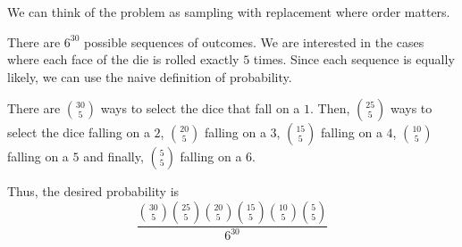 We can think of the problem as sampling with replacement where order matters.

There are $6^{30}$ possible sequences of outcomes. We are interested in the cases where each face of the die is rolled exactly $5$ times. Since each sequence is equally likely, we can use the naive definition of probability.

There are $\binom{30}{5}$ ways to select the dice that fall on a $1$. Then, $\binom{25}{5}$ ways to select the dice falling on a $2$, $\binom{20}{5}$ falling on a $3$, $\binom{15}{5}$ falling on a $4$, $\binom{10}{5}$ falling on a $5$ and finally, $\binom{5}{5}$ falling on a $6$.

Thus, the desired probability is $$\frac{\binom{30}{5} \binom{25}{5} \binom{20}{5} \binom{15}{5} \binom{10}{5} \binom{5}{5}}{6^{30}}$$ 